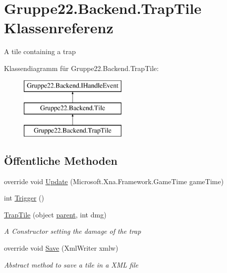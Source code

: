 \hypertarget{class_gruppe22_1_1_backend_1_1_trap_tile}{\section{Gruppe22.\-Backend.\-Trap\-Tile Klassenreferenz}
\label{class_gruppe22_1_1_backend_1_1_trap_tile}
}


A tile containing a trap  


Klassendiagramm für Gruppe22.\-Backend.\-Trap\-Tile\-:\begin{figure}[H]
\begin{center}
\leavevmode
\includegraphics[height=3.000000cm]{class_gruppe22_1_1_backend_1_1_trap_tile}
\end{center}
\end{figure}
\subsection*{Öffentliche Methoden}
\begin{DoxyCompactItemize}
\item 
override void \hyperlink{class_gruppe22_1_1_backend_1_1_trap_tile_a9a71d28fc3ef616afb5f396d52611fbe}{Update} (Microsoft.\-Xna.\-Framework.\-Game\-Time game\-Time)
\item 
int \hyperlink{class_gruppe22_1_1_backend_1_1_trap_tile_a87750604487a67dc3cdfbbe81d46d06c}{Trigger} ()
\item 
\hyperlink{class_gruppe22_1_1_backend_1_1_trap_tile_ad399b6665cb6df29051b7452ed269f1a}{Trap\-Tile} (object \hyperlink{class_gruppe22_1_1_backend_1_1_tile_abc12933c70eb3a2ebbb2fde9f45c2632}{parent}, int dmg)
\begin{DoxyCompactList}\small\item\em A Constructor setting the damage of the trap \end{DoxyCompactList}\item 
override void \hyperlink{class_gruppe22_1_1_backend_1_1_trap_tile_a923a400fdf039c83ef4e6c3a42170b73}{Save} (Xml\-Writer xmlw)
\begin{DoxyCompactList}\small\item\em Abstract method to save a tile in a X\-M\-L file \end{DoxyCompactList}\end{DoxyCompactItemize}
